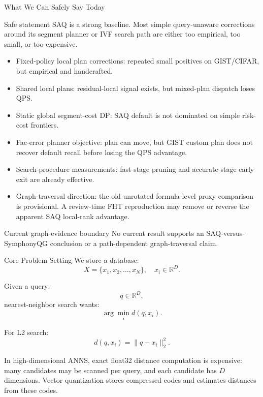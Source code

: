 \documentclass[aspectratio=169,10pt]{beamer}
\begin{document}
\begin{frame}[fragile]{What We Can Safely Say Today}
\small
\begin{block}{Safe statement}
SAQ is a strong baseline. Most simple query-unaware corrections around its
segment planner or IVF search path are either too empirical, too small, or too
expensive.
\end{block}

\vspace{0.5em}
\begin{itemize}
  \item Fixed-policy local plan corrections: repeated small positives on GIST/CIFAR, but empirical and handcrafted.
  \item Shared local plans: residual-local signal exists, but mixed-plan dispatch loses QPS.
  \item Static global segment-cost DP: SAQ default is not dominated on simple risk-cost frontiers.
  \item Fac-error planner objective: plan can move, but GIST custom plan does not recover default recall before losing the QPS advantage.
  \item Search-procedure measurements: fast-stage pruning and accurate-stage early exit are already effective.
  \item Graph-traversal direction: the old unrotated formula-level proxy
  comparison is provisional. A review-time FHT reproduction may remove or
  reverse the apparent SAQ local-rank advantage.
\end{itemize}

\begin{alertblock}{Current graph-evidence boundary}
No current result supports an SAQ-versus-SymphonyQG conclusion or a
path-dependent graph-traversal claim.
\end{alertblock}
\end{frame}

\begin{frame}[fragile]{Core Problem Setting}
\small
We store a database:
\[
X = \{x_1, x_2, \ldots, x_N\}, \quad x_i \in \mathbb{R}^D.
\]

Given a query:
\[
q \in \mathbb{R}^D,
\]
nearest-neighbor search wants:
\[
\arg\min_i d(q, x_i).
\]

For L2 search:
\[
d(q,x_i)=\|q-x_i\|_2^2.
\]

\vspace{0.5em}
In high-dimensional ANNS, exact float32 distance computation is expensive:
many candidates may be scanned per query, and each candidate has \(D\) dimensions.
Vector quantization stores compressed codes and estimates distances from these codes.
\end{frame}
\end{document}

